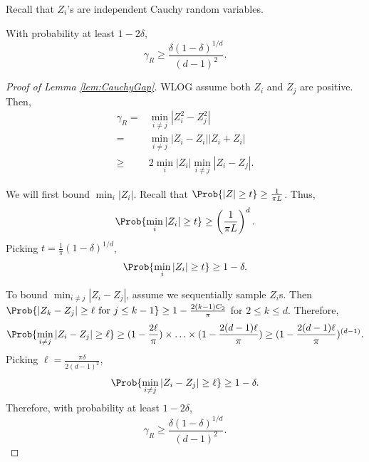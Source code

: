 Recall that $Z_i$'s are independent Cauchy random variables.
\begin{lemma}
\label{lem:CauchyGap}
With probability at least $1-2\delta$,
\[
\gamma_R \ge \frac{\delta(1-\delta)^{1/d}}{(d-1)^2}.
\]
\end{lemma}
\begin{proof}[Proof of Lemma \ref{lem:CauchyGap}]
WLOG assume both $Z_i$ and $Z_j$ are positive. Then, 
\begin{align*}
\gamma_R =	& \min_{i\neq j} \left\vert Z_i^2 - Z_j^2 \right\vert \\
	=		& \min_{i\neq j}\left\vert Z_i - Z_i \right\vert	\left\vert Z_i + Z_i \right\vert \\
	\ge 	& 2\min_i\vert Z_i\vert\min_{i\neq j} \left\vert Z_i - Z_j \right\vert.
\end{align*}

We will first bound $\min_i |Z_i|$. Recall that $\Prob{|Z|\ge t} \ge \frac{1}{\pi L}$. Thus,
\[
\Prob{\min_i |Z_i| \ge t} \ge \left(\frac{1}{\pi L}\right)^d.
\]
Picking $t = \frac{1}{\pi}(1-\delta)^{1/d}$, 
\[
\Prob{\min_i |Z_i| \ge t} \ge 1-\delta.
\]

To bound $\min_{i\neq j} \left\vert Z_i - Z_j \right\vert$, assume we sequentially sample $Z_i$s. 
Then $\Prob{ |Z_{k}- Z_j|\ge \ell \text{ for } j\le k-1} \ge 1-\frac{2(k-1)C_2}{\pi}$ for $2 \le k\le d$.
Therefore,
\begin{equation}
\label{eq:ProbEZ}
\Prob{\min_{i\neq j} \left\vert Z_i - Z_j \right\vert \ge \ell} \ge (1-\frac{2\ell}{\pi})\times \ldots \times (1-\frac{2(d-1)\ell}{\pi}) \ge (1-\frac{2(d-1)\ell}{\pi})^{(d-1)}.
\end{equation}
Picking $\ell = \frac{\pi\delta}{2(d-1)^2}$,
\[
\Prob{\min_{i\neq j} \left\vert Z_i - Z_j \right\vert \ge \ell} \ge 1-\delta.
\]
Therefore, with probability at least $1-2\delta$,
\[
\gamma_R \ge \frac{\delta(1-\delta)^{1/d}}{(d-1)^2}.
\]
\end{proof}


